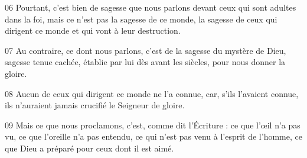 
06 Pourtant, c’est bien de sagesse que nous parlons devant ceux qui sont adultes dans la foi, mais ce n’est pas la sagesse de ce monde, la sagesse de ceux qui dirigent ce monde et qui vont à leur destruction.

07 Au contraire, ce dont nous parlons, c’est de la sagesse du mystère de Dieu, sagesse tenue cachée, établie par lui dès avant les siècles, pour nous donner la gloire.

08 Aucun de ceux qui dirigent ce monde ne l’a connue, car, s’ils l’avaient connue, ils n’auraient jamais crucifié le Seigneur de gloire.

09 Mais ce que nous proclamons, c’est, comme dit l’Écriture : ce que l’œil n’a pas vu, ce que l’oreille n’a pas entendu, ce qui n’est pas venu à l’esprit de l’homme, ce que Dieu a préparé pour ceux dont il est aimé.
